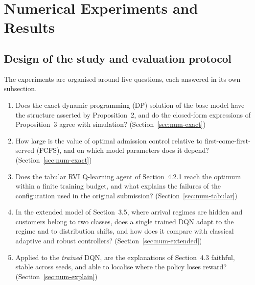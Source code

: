 
\section{Numerical Experiments and Results}\label{sec:numerics}

\subsection{Design of the study and evaluation protocol}\label{sec:num-design}

The experiments are organised around five questions, each answered in its own subsection.
\begin{enumerate}
\item[(Q1)] Does the exact dynamic-programming (DP) solution of the base model have the structure asserted by Proposition~2, and do the closed-form expressions of Proposition~3 agree with simulation? (Section~\ref{sec:num-exact})
\item[(Q2)] How large is the value of optimal admission control relative to first-come-first-served (FCFS), and on which model parameters does it depend? (Section~\ref{sec:num-exact})
\item[(Q3)] Does the tabular RVI Q-learning agent of Section~4.2.1 reach the optimum within a finite training budget, and what explains the failures of the configuration used in the original submission? (Section~\ref{sec:num-tabular})
\item[(Q4)] In the extended model of Section~3.5, where arrival regimes are hidden and customers belong to two classes, does a single trained DQN adapt to the regime and to distribution shifts, and how does it compare with classical adaptive and robust controllers? (Section~\ref{sec:num-extended})
\item[(Q5)] Applied to the \emph{trained} DQN, are the explanations of Section~4.3 faithful, stable across seeds, and able to localise where the policy loses reward? (Section~\ref{sec:num-explain})
\end{enumerate}

